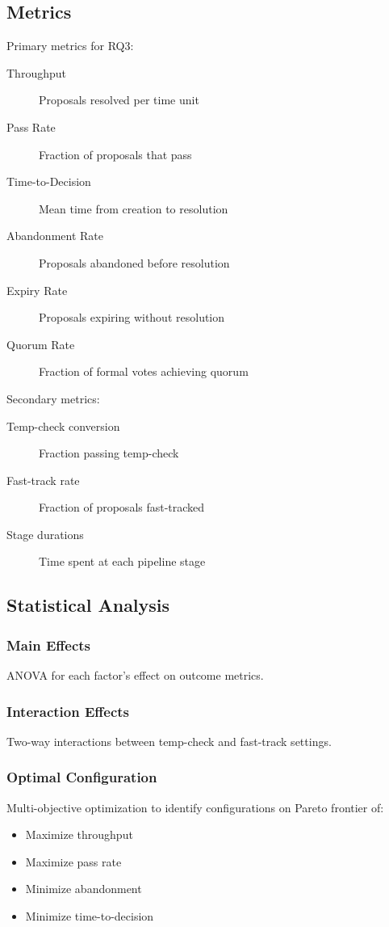 \subsection{Metrics}

Primary metrics for RQ3:

\begin{description}
    \item[Throughput] Proposals resolved per time unit
    \item[Pass Rate] Fraction of proposals that pass
    \item[Time-to-Decision] Mean time from creation to resolution
    \item[Abandonment Rate] Proposals abandoned before resolution
    \item[Expiry Rate] Proposals expiring without resolution
    \item[Quorum Rate] Fraction of formal votes achieving quorum
\end{description}

Secondary metrics:

\begin{description}
    \item[Temp-check conversion] Fraction passing temp-check
    \item[Fast-track rate] Fraction of proposals fast-tracked
    \item[Stage durations] Time spent at each pipeline stage
\end{description}

\subsection{Statistical Analysis}

\subsubsection{Main Effects}

ANOVA for each factor's effect on outcome metrics.

\subsubsection{Interaction Effects}

Two-way interactions between temp-check and fast-track settings.

\subsubsection{Optimal Configuration}

Multi-objective optimization to identify configurations on Pareto frontier of:
\begin{itemize}
    \item Maximize throughput
    \item Maximize pass rate
    \item Minimize abandonment
    \item Minimize time-to-decision
\end{itemize}

